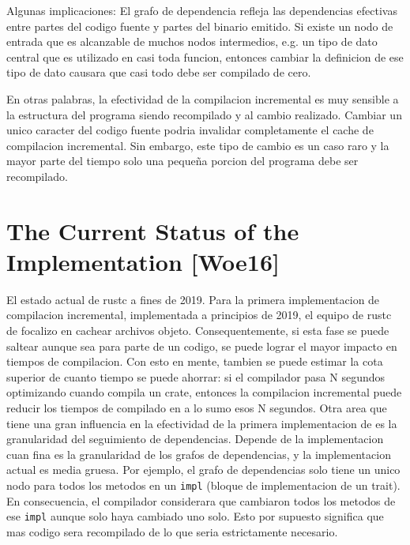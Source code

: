 \documentclass[12pt, a4paper]{report}
\begin{document}
    Algunas implicaciones:
    El grafo de dependencia refleja las dependencias efectivas entre partes del codigo fuente y partes del binario emitido.
    Si existe un nodo de entrada que es alcanzable de muchos nodos intermedios, e.g. un tipo de dato central que es utilizado en casi toda funcion, entonces cambiar la definicion de ese tipo de dato causara que casi todo debe ser compilado de cero.

    En otras palabras, la efectividad de la compilacion incremental es muy sensible a la estructura del programa siendo recompilado y al cambio realizado.
    Cambiar un unico caracter del codigo fuente podria invalidar completamente el cache de compilacion incremental.
    Sin embargo, este tipo de cambio es un caso raro y la mayor parte del tiempo solo una pequeña porcion del programa debe ser recompilado.
    \cite{rust_blog_incremental_compilation}

  \section*{The Current Status of the Implementation [Woe16]}

    El estado actual de rustc a fines de 2019.
    Para la primera implementacion de compilacion incremental, implementada a principios de 2019, el equipo de rustc de focalizo en cachear archivos objeto.
    Consequentemente, si esta fase se puede saltear aunque sea para parte de un codigo, se puede lograr el mayor impacto en tiempos de compilacion.
    Con esto en mente, tambien se puede estimar la cota superior de cuanto tiempo se puede ahorrar: si el compilador pasa N segundos optimizando cuando compila un crate, entonces la compilacion incremental puede reducir los tiempos de compilado en a lo sumo esos N segundos.
    Otra area que tiene una gran influencia en la efectividad de la primera implementacion de es la granularidad del seguimiento de dependencias.
    Depende de la implementacion cuan fina es la granularidad de los grafos de dependencias, y la implementacion actual es media gruesa.
    Por ejemplo, el grafo de dependencias solo tiene un unico nodo para todos los metodos en un \texttt{impl} (bloque de implementacion de un trait).
    En consecuencia, el compilador considerara que cambiaron todos los metodos de ese \texttt{impl} aunque solo haya cambiado uno solo.
    Esto por supuesto significa que mas codigo sera recompilado de lo que seria estrictamente necesario.
    \cite{rust_blog_incremental_compilation}
\end{document}
